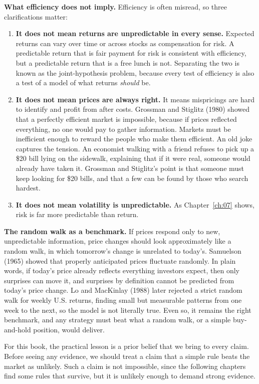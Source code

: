 \textbf{What efficiency does not imply.} Efficiency is often misread, so three clarifications matter:

\begin{enumerate}
  \item \textbf{It does not mean returns are unpredictable in every sense.} Expected returns can vary over time or across stocks as compensation for risk. A predictable return that is fair payment for risk is consistent with efficiency, but a predictable return that is a free lunch is not. Separating the two is known as the joint-hypothesis problem, because every test of efficiency is also a test of a model of what returns \emph{should} be.
  \item \textbf{It does not mean prices are always right.} It means mispricings are hard to identify and profit from after costs. Grossman and Stiglitz (1980) showed that a perfectly efficient market is impossible, because if prices reflected everything, no one would pay to gather information. Markets must be inefficient enough to reward the people who make them efficient. An old joke captures the tension. An economist walking with a friend refuses to pick up a \$20 bill lying on the sidewalk, explaining that if it were real, someone would already have taken it. Grossman and Stiglitz's point is that someone must keep looking for \$20 bills, and that a few can be found by those who search hardest.
  \item \textbf{It does not mean volatility is unpredictable.} As Chapter~\ref{ch:07} shows, risk is far more predictable than return.
\end{enumerate}

\textbf{The random walk as a benchmark.} If prices respond only to new, unpredictable information, price changes should look approximately like a random walk, in which tomorrow's change is unrelated to today's. Samuelson (1965) showed that properly anticipated prices fluctuate randomly. In plain words, if today's price already reflects everything investors expect, then only surprises can move it, and surprises by definition cannot be predicted from today's price change. Lo and MacKinlay (1988) later rejected a strict random walk for weekly U.S. returns, finding small but measurable patterns from one week to the next, so the model is not literally true. Even so, it remains the right benchmark, and any strategy must beat what a random walk, or a simple buy-and-hold position, would deliver.

For this book, the practical lesson is a prior belief that we bring to every claim. Before seeing any evidence, we should treat a claim that a simple rule beats the market as unlikely. Such a claim is not impossible, since the following chapters find some rules that survive, but it is unlikely enough to demand strong evidence.

